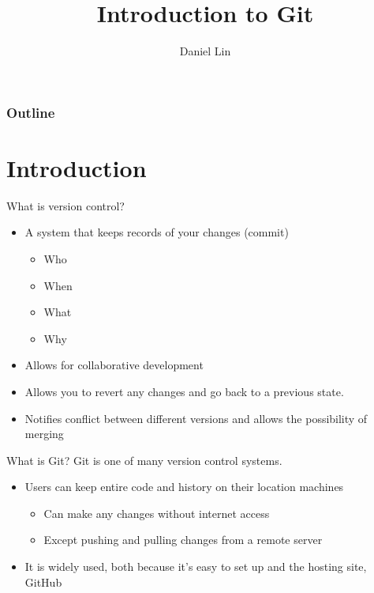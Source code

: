 \documentclass[11pt]{beamer}
\begin{document}
\title{Introduction to Git}
\author{Daniel Lin}
\date{}


\maketitle

\begin{frame}
\frametitle{Outline}
\tableofcontents
\end{frame}

\section{Introduction}
\begin{frame}{What is version control?}
\begin{itemize}
\item
A system that keeps records of your changes (commit)
	\begin{itemize}
		\item Who
		\item When
		\item What
		\item Why
	\end{itemize}
\item
Allows for collaborative development
\item
Allows you to revert any changes and go back to a previous state.
\item
Notifies conflict between different versions and allows the possibility of merging
\end{itemize}
\end{frame}

\begin{frame}{What is Git?}
Git is one of many version control systems.
\begin{itemize}
	\item
	Users can keep entire code and history on their location machines
	\begin{itemize}
		\item Can make any changes without internet access
		\item Except pushing and pulling changes from a remote server
	\end{itemize}
	\item
	It is widely used, both because it's easy to set up and the hosting site, GitHub
\end{itemize}
\end{frame}
\end{document}
